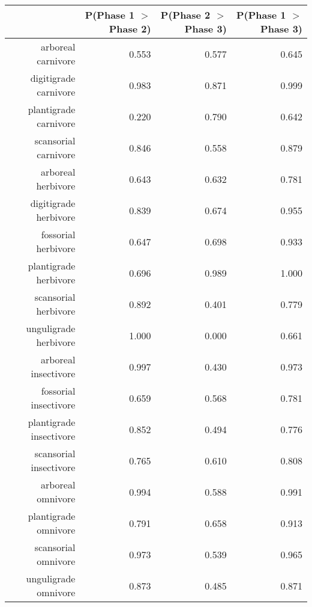 \begin{table}[ht]
\centering
\begin{tabular}{rrrr}
  \hline
 & P(Phase 1 $>$ Phase 2) & P(Phase 2 $>$ Phase 3) & P(Phase 1 $>$ Phase 3) \\ 
  \hline
arboreal carnivore & 0.553 & 0.577 & 0.645 \\ 
  digitigrade carnivore & 0.983 & 0.871 & 0.999 \\ 
  plantigrade carnivore & 0.220 & 0.790 & 0.642 \\ 
  scansorial carnivore & 0.846 & 0.558 & 0.879 \\ 
  arboreal herbivore & 0.643 & 0.632 & 0.781 \\ 
  digitigrade herbivore & 0.839 & 0.674 & 0.955 \\ 
  fossorial herbivore & 0.647 & 0.698 & 0.933 \\ 
  plantigrade herbivore & 0.696 & 0.989 & 1.000 \\ 
  scansorial herbivore & 0.892 & 0.401 & 0.779 \\ 
  unguligrade herbivore & 1.000 & 0.000 & 0.661 \\ 
  arboreal insectivore & 0.997 & 0.430 & 0.973 \\ 
  fossorial insectivore & 0.659 & 0.568 & 0.781 \\ 
  plantigrade insectivore & 0.852 & 0.494 & 0.776 \\ 
  scansorial insectivore & 0.765 & 0.610 & 0.808 \\ 
  arboreal omnivore & 0.994 & 0.588 & 0.991 \\ 
  plantigrade omnivore & 0.791 & 0.658 & 0.913 \\ 
  scansorial omnivore & 0.973 & 0.539 & 0.965 \\ 
  unguligrade omnivore & 0.873 & 0.485 & 0.871 \\ 
   \hline
\end{tabular}
\label{tab:origin_plant}
\end{table}
